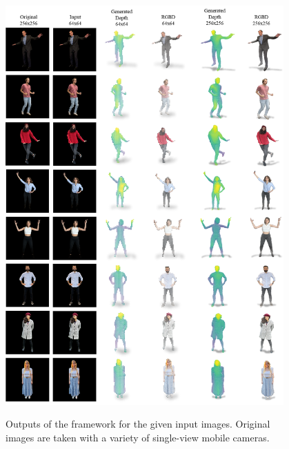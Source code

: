 \begin{figure}[t]
  \centering
  \caption{Outputs of the \modelname{} framework for the given input images. Original images are taken with a variety of single-view mobile cameras.}
  \includegraphics[width=0.95\textwidth]{illustrations/appendix_rgbd2.png}
  \label{fig:rgb_d_fusion_wild_rgbd_2}
\end{figure}

